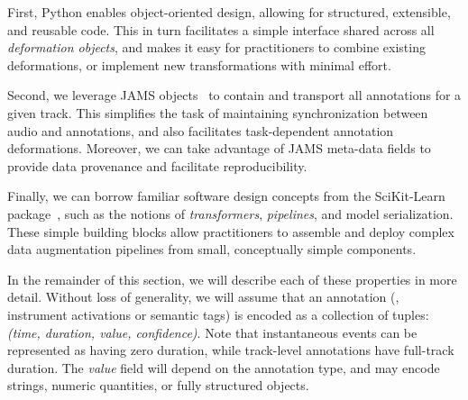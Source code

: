 \documentclass{article}
\begin{document}
%
First, Python enables object-oriented design, allowing for structured,
extensible, and reusable code.  This in turn facilitates a simple interface shared across
all \emph{deformation objects}, and makes it easy for practitioners to combine existing
deformations, or implement new transformations with minimal effort.

%

Second, we leverage JAMS objects~\cite{humphreyjams} to contain and transport all
annotations for a given track.
This simplifies the task of maintaining synchronization between audio and annotations,
and also facilitates task-dependent annotation deformations.  Moreover, we can take
advantage of JAMS meta-data fields to provide data provenance and facilitate
reproducibility.

%
Finally, we can borrow familiar software design concepts from the SciKit-Learn
package~\cite{scikit-learn}, such as the notions of \emph{transformers},
\emph{pipelines}, and model serialization.  These simple building blocks allow
practitioners to assemble and deploy complex data augmentation pipelines from small,
conceptually simple components.


In the remainder of this section, we will describe each of these
properties in more detail.  Without loss of generality, we will assume that an
annotation (\eg, instrument activations or semantic tags) is encoded as a collection of
tuples: \emph{(time, duration, value, confidence)}.
Note that instantaneous events can be represented as having zero duration, while
track-level annotations have full-track duration.  The \emph{value} field will depend on
the annotation type, and may encode strings, numeric quantities, or fully structured
objects.
\end{document}
